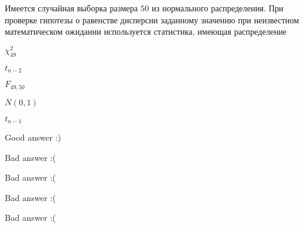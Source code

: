 
\begin{question}
Имеется случайная выборка размера \(50\) из нормального распределения.
При проверке гипотезы о равенстве дисперсии заданному значению при
неизвестном математическом ожидании используется статистика, имеющая
распределение
\begin{answerlist}
  \item \(\chi^2_{49}\)
  \item \(t_{n-2}\)
  \item \(F_{49,50}\)
  \item \(N(0,1)\)
  \item \(t_{n-1}\)
\end{answerlist}
\end{question}

\begin{solution}
\begin{answerlist}
  \item Good answer :)
  \item Bad answer :(
  \item Bad answer :(
  \item Bad answer :(
  \item Bad answer :(
\end{answerlist}
\end{solution}

